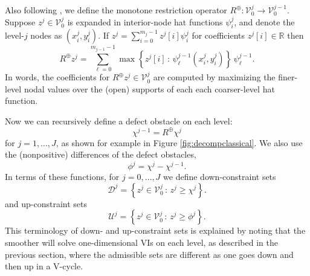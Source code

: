 \documentclass[letterpaper,final,12pt,reqno]{amsart}
\theoremstyle{claim}
\newcommand{\RR}{\mathbb{R}}
\newcommand{\mR}{R^{\bm{\oplus}}}
\numberwithin{equation}{section}
\numberwithin{figure}{section}
\numberwithin{table}{section}
\numberwithin{theorem}{section}
\begin{document}
Also following \cite{GraeserKornhuber2009}, we define the monotone restriction operator $\mR : \mathcal{V}_0^j \to \mathcal{V}_0^{j-1}$.  Suppose $z^j \in \mathcal{V}_0^j$ is expanded in interior-node hat functions $\psi_i^j$, and denote the level-$j$ nodes as $(x_i^j,y_i^j)$.  If $z^j = \sum_{i=0}^{m_j-1} z^j[i] \psi_i^j$ for coefficients $z^j[i]\in \RR$ then
\begin{equation}
\mR z^j = \sum_{\ell=0}^{m_{j-1}-1} \max\left\{z^j[i] \,:\,\psi_\ell^{j-1}(x_i^j,y_i^j) \right\}\,\psi_\ell^{j-1}.  \label{eq:monotonerestriction}
\end{equation}
In words, the coefficients for $\mR z^j \in \mathcal{V}_0^j$ are computed by maximizing the finer-level nodal values over the (open) supports of each each coarser-level hat function.

Now we can recursively define a defect obstacle on each level:
\begin{equation}
\chi^{j-1} = \mR \chi^j  \label{eq:recursivedefectobstacle}
\end{equation}
for $j=1,\dots,J$, as shown for example in Figure \ref{fig:decompclassical}.  We also use the (nonpositive) differences of the defect obstacles,
\begin{equation}
\phi^j = \chi^j - \chi^{j-1}.  \label{eq:downobstacles}
\end{equation}
In terms of these functions, for $j=0,\dots,J$ we define down-constraint sets
\begin{equation}
\mathcal{D}^j = \left\{z^j \in \mathcal{V}_0^j \,:\, z^j \ge \chi^j\right\}.  \label{eq:downconstraintset}
\end{equation}
and up-constraint sets
\begin{equation}
\mathcal{U}^j = \left\{z^j \in \mathcal{V}_0^j \,:\, z^j \ge \phi^j\right\}.  \label{eq:upconstraintset}
\end{equation}
This terminology of down- and up-constraint sets is explained by noting that the smoother will solve one-dimensional VIs on each level, as described in the previous section, where the admissible sets are different as one goes down and then up in a V-cycle.
\end{document}
